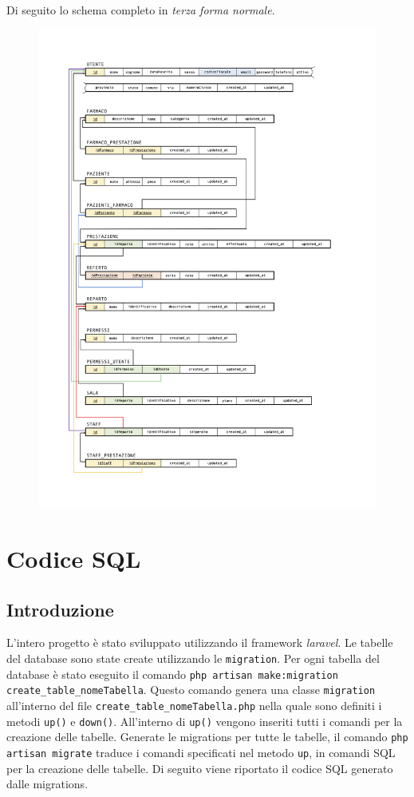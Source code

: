 \documentclass[paper=a4, fontsize=11pt,x11names]{report}
\begin{document}
Di seguito lo schema completo in \textit{terza forma normale}.
\begin{figure}
\begin{center}
\includegraphics[scale=0.85]{schema_relazionale}
\end{center}
\end{figure}



\chapter{Codice SQL}
\section{Introduzione}
L'intero progetto è stato sviluppato utilizzando il framework \textit{laravel}. Le tabelle del database sono state create utilizzando le \texttt{migration}. Per ogni tabella del database è stato eseguito il comando \texttt{php artisan make:migration create\_table\_nomeTabella}. Questo comando genera una classe \texttt{migration} all'interno del file \texttt{create\_table\_nomeTabella.php} nella quale sono definiti i metodi \texttt{up()} e \texttt{down()}. All'interno di \texttt{up()} vengono inseriti tutti i comandi per la creazione delle tabelle. Generate le migrations per tutte le tabelle, il comando \texttt{php artisan migrate} traduce i comandi specificati nel metodo \texttt{up}, in comandi SQL per la creazione delle tabelle. Di seguito viene riportato il codice SQL generato dalle migrations.
\end{document}
